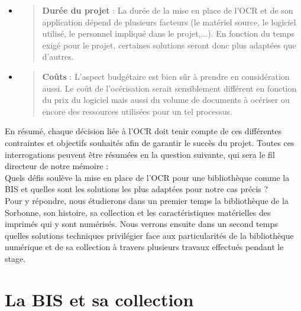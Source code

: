 \documentclass[a4paper,12pt,twoside]{book}
\begin{document}
\begin{itemize}
	\item
	\begin{quote}
		\textbf{Durée du projet} : La durée de la mise en place de l'OCR et de
		son application dépend de plusieurs facteurs (le matériel source, le
		logiciel utilisé, le personnel impliqué dans le projet,...). En
		fonction du temps exigé pour le projet, certaines solutions seront
		donc plus adaptées que d'autres.
	\end{quote}
	\item
	\begin{quote}
		\textbf{Coûts} : L'aspect budgétaire est bien sûr à
		prendre en considération aussi. Le coût de l'océrisation serait
		sensiblement différent en fonction du prix du logiciel mais aussi du
		volume de documents à océriser ou encore des ressources utilisées pour un tel processus. \\
	\end{quote}
\end{itemize} 

En résumé, chaque décision liée à l'OCR doit tenir
compte de ces différentes contraintes et objectifs souhaités afin de
garantir le succès du projet. Toutes ces interrogations peuvent être
résumées en la question suivante, qui sera le fil directeur de notre
mémoire : \\

Quels défis soulève la mise en place de l'OCR pour une bibliothèque
comme la BIS et quelles sont les solutions les plus adaptées pour notre
cas précis ? \\

Pour y répondre, nous étudierons dans un premier temps la bibliothèque
de la Sorbonne, son histoire, sa collection et les caractéristiques
matérielles des imprimés qui y sont numérisés. Nous verrons ensuite dans
un second temps quelles solutions techniques privilégier face aux
particularités de la bibliothèque numérique et de sa collection à
travers plusieurs travaux effectués pendant le stage.

\newpage{\pagestyle{empty}\cleardoublepage}

	\mainmatter

	

	\chapter{La BIS et sa collection}
\end{document}
